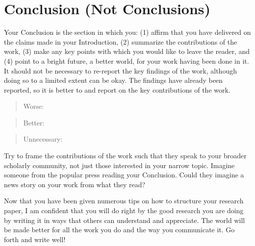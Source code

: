 \section{Conclusion (Not Conclusion{\color{red}s})}
Your Conclusion is the section in which you: 
(1) affirm that you have delivered on the claims made in your Introduction,
(2) summarize the contributions of the work, 
(3) make any key points with which you would like to leave the reader, and
(4) point to a bright future, a better world, for your work having been done in it.
It should not be necessary to re-report the key findings of the work, although doing so to a limited extent can be okay. 
The findings have already been reported, so it is better to  and report on the key contributions of the work.
\begin{quote}
    Worse: 
\end{quote}
\begin{quote}
    Better: 
\end{quote}
\begin{quote}
    Unnecessary: 
\end{quote}
    
Try to frame the contributions of the work such that they speak to your broader scholarly community, not just those interested in your narrow topic. 
Imagine someone from the popular press reading your Conclusion. 
Could they imagine a news story on your work from what they read?

Now that you have been given numerous tips on how to structure your research paper, I am confident that you will do right by the good research you are doing by writing it in ways that others can understand and appreciate. 
The world will be made better for all the work you do and the way you communicate it. 
Go forth and write well!
